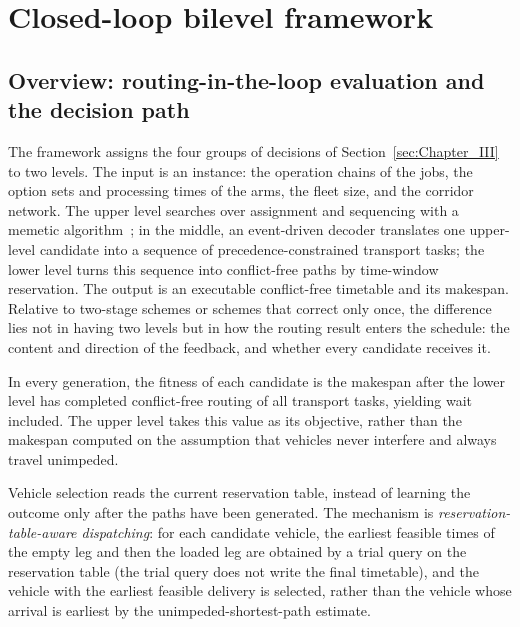 \section{Closed-loop bilevel framework}
\label{sec:Chapter_IV}
\subsection{Overview: routing-in-the-loop evaluation and the decision path}
\label{sec:overview}

The framework assigns the four groups of decisions of Section~\ref{sec:Chapter_III} to two levels. The input is an instance: the operation chains of the jobs,
the option sets and processing times of the arms, the fleet size, and the corridor network. The upper level searches over assignment and sequencing with a memetic algorithm~\cite{zhang2024memetic}; in the middle,
an event-driven decoder translates one upper-level candidate into a sequence of precedence-constrained transport tasks; the lower level turns
this sequence into conflict-free paths by time-window reservation.
The output is an executable conflict-free timetable and its makespan.
Relative to two-stage schemes or schemes that correct only once, the difference lies not in having two levels but in how the routing result enters the schedule: the content and direction of the feedback, and whether every candidate receives it.


\begin{description}[leftmargin=0pt,topsep=3pt,itemsep=3pt]
  \item[The evaluation path, i.e.\ \emph{routing-in-the-loop evaluation}.]
  In every generation, the fitness of each candidate is the makespan after the lower level has completed conflict-free routing of all transport tasks, yielding wait included.
  The upper level takes this value as its objective, rather than the makespan computed on the assumption that vehicles never interfere and always travel unimpeded.
  \item[The decision path.]
  Vehicle selection reads the current reservation table, instead of learning the outcome only after the paths have been generated.
  The mechanism is \emph{reservation-table-aware dispatching}: for each candidate vehicle, the earliest feasible times of the empty leg and then the loaded leg are obtained by a trial query on the reservation table (the trial query does not write the final timetable), and the vehicle with the earliest feasible delivery is selected, rather than the vehicle whose arrival is earliest by the unimpeded-shortest-path estimate.
\end{description}

